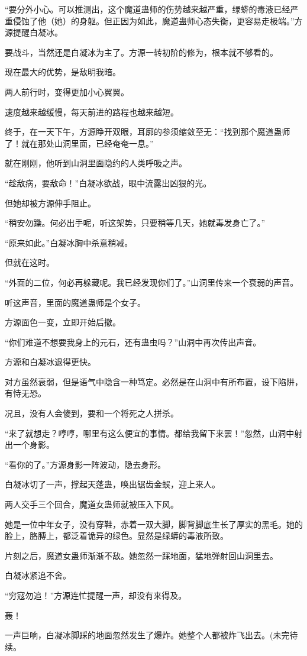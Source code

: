 \begin{this_body}
“要分外小心。可以推测出，这个魔道蛊师的伤势越来越严重，绿蟒的毒液已经严重侵蚀了他（她）的身躯。但正因为如此，魔道蛊师心态失衡，更容易走极端。”方源提醒白凝冰。

要战斗，当然还是白凝冰为主了。方源一转初阶的修为，根本就不够看的。

现在最大的优势，是敌明我暗。

两人前行时，变得更加小心翼翼。

速度越来越缓慢，每天前进的路程也越来越短。

终于，在一天下午，方源睁开双眼，耳廓的参须缩敛至无：“找到那个魔道蛊师了！就在那处山洞里面，已经奄奄一息。”

就在刚刚，他听到山洞里面隐约的人类呼吸之声。

“趁敌病，要敌命！”白凝冰欲战，眼中流露出凶狠的光。

但她却被方源伸手阻止。

“稍安勿躁。何必出手呢，听这架势，只要稍等几天，她就毒发身亡了。”

“原来如此。”白凝冰胸中杀意稍减。

但就在这时。

“外面的二位，何必再躲藏呢。我已经发现你们了。”山洞里传来一个衰弱的声音。

听这声音，里面的魔道蛊师是个女子。

方源面色一变，立即开始后撤。

“你们难道不想要我身上的元石，还有蛊虫吗？”山洞中再次传出声音。

方源和白凝冰退得更快。

对方虽然衰弱，但是语气中隐含一种笃定。必然是在山洞中有所布置，设下陷阱，有恃无恐。

况且，没有人会傻到，要和一个将死之人拼杀。

“来了就想走？哼哼，哪里有这么便宜的事情。都给我留下来罢！”忽然，山洞中射出一个身影。

“看你的了。”方源身影一阵波动，隐去身形。

白凝冰切了一声，撑起天蓬蛊，唤出锯齿金蜈，迎上来人。

两人交手三个回合，魔道女蛊师就被压入下风。

她是一位中年女子，没有穿鞋，赤着一双大脚，脚背脚底生长了厚实的黑毛。她的脸上，胳膊上，都泛着诡异的绿色。显然是绿蟒的毒液所致。

片刻之后，魔道女蛊师渐渐不敌。她忽然一踩地面，猛地弹射回山洞里去。

白凝冰紧追不舍。

“穷寇勿追！”方源连忙提醒一声，却没有来得及。

轰！

一声巨响，白凝冰脚踩的地面忽然发生了爆炸。她整个人都被炸飞出去。(未完待续。

\end{this_body}

